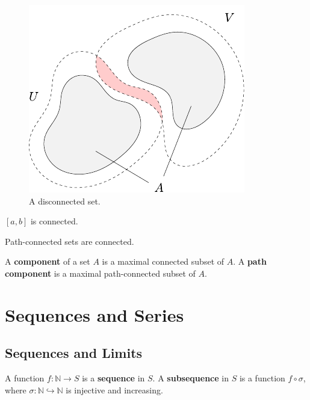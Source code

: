 \documentclass[10pt]{report}
\begin{document}
\begin{figure}[H]
	\centering
	\includegraphics[scale=1]{fig/disconnected.pdf}
	\caption{A disconnected set.}
\end{figure}

\begin{prop}
	$[a,b]$ is connected.
\end{prop}

\begin{thrm}[]
Path-connected sets are connected.
\end{thrm}

\begin{defn}[]
	A \textbf{component} of a set $A$ is a maximal connected subset of $A$. A \textbf{path component} is a maximal path-connected subset of $A$.
\end{defn}


\chapter{Sequences and Series}


\section{Sequences and Limits}

\begin{defn}[]
	A function $f:\mathbb{N} \to S$ is a \textbf{sequence} in $S$. A \textbf{subsequence} in $S$ is a function $f \circ \sigma$, where $\sigma:\mathbb{N}\hookrightarrow \mathbb{N}$ is injective and increasing.
\end{defn}
\end{document}
